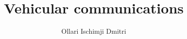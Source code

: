 \documentclass[12pt]{report}
\begin{document}
\title{Vehicular communications}
\author{Ollari Ischimji Dmitri}

\maketitle
\tableofcontents



\end{document}
